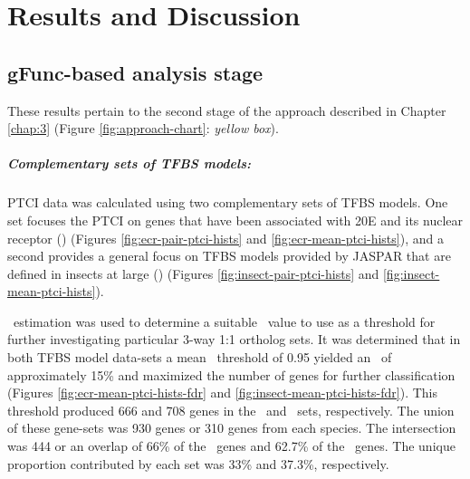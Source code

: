 \chapter{Results and Discussion} \label{chap:4}

% 

\section{gFunc-based analysis stage}

These results pertain to the second stage of the approach described in Chapter \ref{chap:3} (Figure \ref{fig:approach-chart}: \textit{yellow box}).

\paragraph*{Complementary sets of TFBS models:}
\gls{PTCI} data was calculated using two complementary sets of \gls{TFBS} models.
%
One set focuses the \gls{PTCI} on genes that have been associated with \gls{20E} and its nuclear receptor (\PTCIe) (Figures \ref{fig:ecr-pair-ptci-hists} and \ref{fig:ecr-mean-ptci-hists}), and a second provides a general focus on \gls{TFBS} models provided by JASPAR that are defined in insects at large (\PTCIi) (Figures \ref{fig:insect-pair-ptci-hists} and \ref{fig:insect-mean-ptci-hists}).
%




%
\FDR\ estimation was used to determine a suitable \PTCI\ value to use as a threshold for further investigating particular 3-way 1:1 ortholog sets.
%
It was determined that in both \gls{TFBS} model data-sets a mean \PTCI\ threshold of 0.95 yielded an \FDR\ of approximately 15\% and maximized the number of genes for further classification (Figures \ref{fig:ecr-mean-ptci-hists-fdr} and \ref{fig:insect-mean-ptci-hists-fdr}).
%
This threshold produced 666 and 708 genes in the \PTCIi\ and \PTCIe\ sets, respectively.
%
The union of these gene-sets was 930 genes or 310 genes from each species.
%
The intersection was 444 or an overlap of 66\% of the \PTCIi\ genes and 62.7\% of the \PTCIe\ genes.
%
The unique proportion contributed by each set was 33\% and 37.3\%, respectively.

